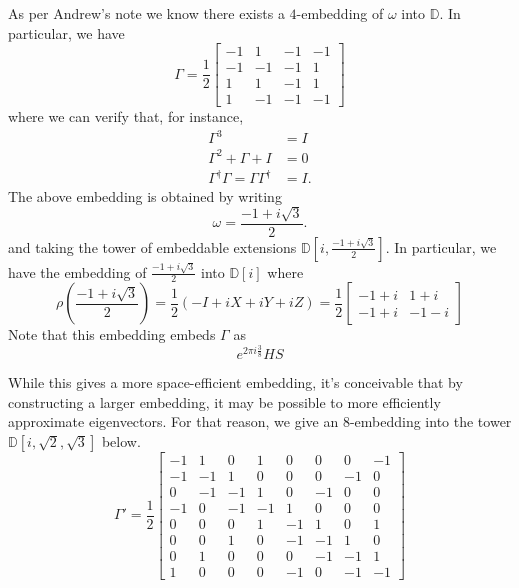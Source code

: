 \documentclass{article}
\theoremstyle{definition}
\theoremstyle{theorem}
\theoremstyle{remark}
\begin{document}
As per Andrew's note we know there exists a $4$-embedding of $\omega$ into $\mathbb{D}$. In particular, we have
\[
	\Gamma = \frac{1}{2}
	\begin{bmatrix} 
		-1 & 1 & -1 & -1 \\
		-1 & -1 & -1 & 1 \\
		1 & 1 & -1 & 1 \\
		1 & -1 & -1 & -1
	\end{bmatrix}
\]
where we can verify that, for instance,
\begin{align*}
	\Gamma^3 &= I \\
	\Gamma^2 + \Gamma + I &= 0 \\
	\Gamma^\dagger \Gamma = \Gamma\Gamma^\dagger &= I.
\end{align*}
The above embedding is obtained by writing
\[
	\omega = \frac{-1 + i\sqrt{3}}{2}.
\]
and taking the tower of embeddable extensions $\mathbb{D}[i, \frac{-1 + i\sqrt{3}}{2}]$. In particular, we have the embedding of $\frac{-1 + i\sqrt{3}}{2}$ into $\mathbb{D}[i]$ where
\[
	\rho\left(\frac{-1 + i\sqrt{3}}{2}\right) 
	= \frac{1}{2}\left(-I + iX + iY + iZ\right) 
	= \frac{1}{2}\begin{bmatrix}  -1 + i & 1 + i \\ -1 + i & -1 -i \end{bmatrix}
\]
Note that this embedding embeds $\Gamma$ as 
\[
	e^{2\pi i\frac{3}{8}}HS
\]

While this gives a more space-efficient embedding, it's conceivable that by constructing a larger embedding, it may be possible to more efficiently approximate eigenvectors. For that reason, we give an $8$-embedding into the tower $\mathbb{D}[i, \sqrt{2}, \sqrt{3}]$ below.
\[
	\Gamma' = \frac{1}{2}
	\begin{bmatrix}
		-1 & 1 & 0 & 1 & 0 & 0 & 0 & -1 \\
		-1 & -1 & 1 & 0 & 0 & 0 & -1 & 0 \\
		0 & -1 & -1 & 1 & 0 & -1 & 0 & 0 \\
		-1 & 0 & -1 & -1 & 1 & 0 & 0 & 0 \\
		0 & 0 & 0 & 1 & -1 & 1 & 0 & 1 \\
		0 & 0 & 1 & 0  & -1 & -1 & 1 & 0 \\
		0 & 1 & 0 & 0 & 0 & -1 & -1 & 1 \\
		1 & 0 & 0 & 0 & -1 & 0 & -1 & -1
	\end{bmatrix}
\]
\end{document}
